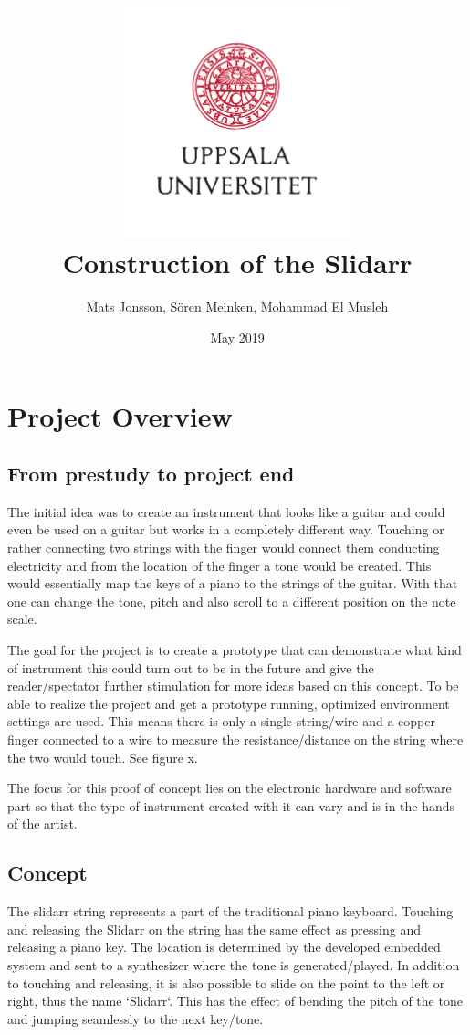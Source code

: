 \documentclass{article}
\title{\includegraphics[width=0.5\textwidth]{UU_logo.pdf}\\
Construction of the Slidarr}
\author{Mats Jonsson, Sören Meinken, Mohammad El Musleh}
\date{May 2019}
\begin{document}
\maketitle

\pagebreak

\tableofcontents

\pagebreak

\section{Project Overview}

\subsection{From prestudy to project end}
The initial idea was to create an instrument that looks like a guitar and could even be used on a guitar but works in a completely different way. Touching or rather connecting two strings with the finger would connect them conducting electricity and from the location of the finger a tone would be created. This would essentially map the keys of a piano to the strings of the guitar. With that one can change the tone, pitch and also scroll to a different position on the note scale.

The goal for the project is to create a prototype that can demonstrate what kind of instrument this could turn out to be in the future and give the reader/spectator further stimulation for more ideas based on this concept. To be able to realize the project and get a prototype running, optimized environment settings are used. This means there is only a single string/wire and a copper finger connected to a wire to measure the resistance/distance on the string where the two would touch. See figure x.

The focus for this proof of concept lies on the electronic hardware and software part so that the type of instrument created with it can vary and is in the hands of the artist.


\subsection{Concept}

The slidarr string represents a part of the traditional piano keyboard. Touching and releasing the Slidarr on the string has the same effect as pressing and releasing a piano key. The location is determined by the developed embedded system and sent to a synthesizer where the tone is generated/played. In addition to touching and releasing, it is also possible to slide on the point to the left or right, thus the name `Slidarr`. This has the effect of bending the pitch of the tone and jumping seamlessly to the next key/tone. 
\end{document}
